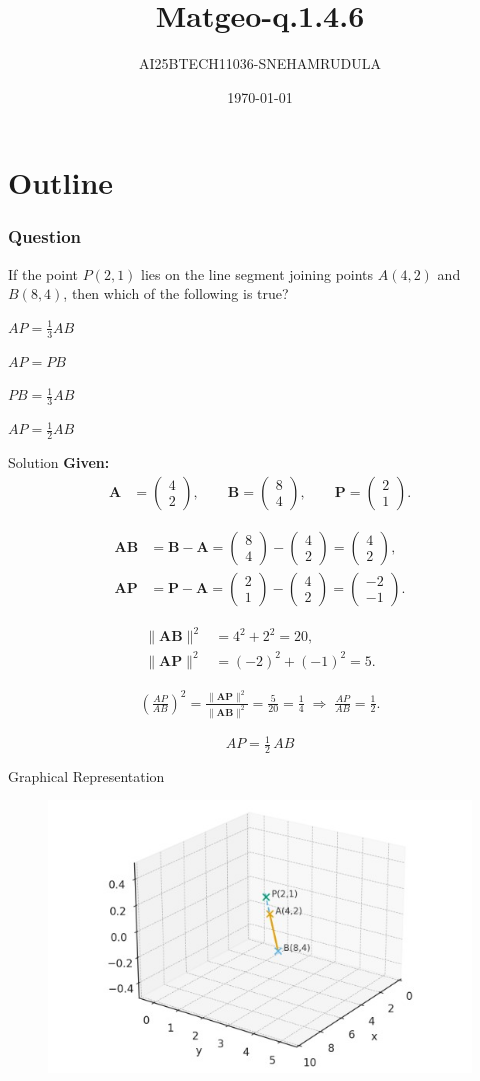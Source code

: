 \documentclass{beamer}
\title{Matgeo-q.1.4.6}
\author{AI25BTECH11036-SNEHAMRUDULA}
\date{\today}
\theoremstyle{remark}
\newcommand{\myvec}[1]{\ensuremath{\begin{pmatrix}#1\end{pmatrix}}}
\let\vec\mathbf
\begin{document}
\begin{frame}
\titlepage
\end{frame}

\section*{Outline}


\begin{frame}
\frametitle{Question}
 If the point $P(2, 1)$ lies on the line segment joining points $A(4, 2)$ and $B(8, 4)$, then which of the following is true?
    \item $AP = \frac{1}{3} AB$
    \item $AP = PB$
    \item $PB = \frac{1}{3} AB$
    \item $AP = \frac{1}{2} AB$

\end{frame}
%
\begin{frame}[t]{Solution}
\small
\textbf{Given:}\;
\begin{align}
\vec{A} &= \myvec{4\\2},\qquad
\vec{B} = \myvec{8\\4},\qquad
\vec{P} = \myvec{2\\1}.
\end{align}

\begin{align}
\vec{AB} &= \vec{B}-\vec{A}
= \myvec{8\\4}-\myvec{4\\2}
= \myvec{4\\2},\\[2mm]
\vec{AP} &= \vec{P}-\vec{A}
= \myvec{2\\1}-\myvec{4\\2}
= \myvec{-2\\-1}.
\end{align}

\begin{align}
\|\vec{AB}\|^2 &= 4^2 + 2^2 = 20,\\[1mm]
\|\vec{AP}\|^2 &= (-2)^2 + (-1)^2 = 5.
\end{align}

\begin{align}
\left(\frac{AP}{AB}\right)^2
= \frac{\|\vec{AP}\|^2}{\|\vec{AB}\|^2}
= \frac{5}{20}
= \frac{1}{4}
\;\Rightarrow\;
\frac{AP}{AB} = \frac{1}{2}.
\end{align}

\[
\boxed{\,AP=\tfrac{1}{2}\,AB\,}
\]
\end{frame}
    \begin{frame}{Graphical Representation}
   \begin{figure}[h!]
\centering
\includegraphics[width=0.7\linewidth]{fig.1.4.6.jpeg}

\end{figure}
\end{frame}
\end{document}
